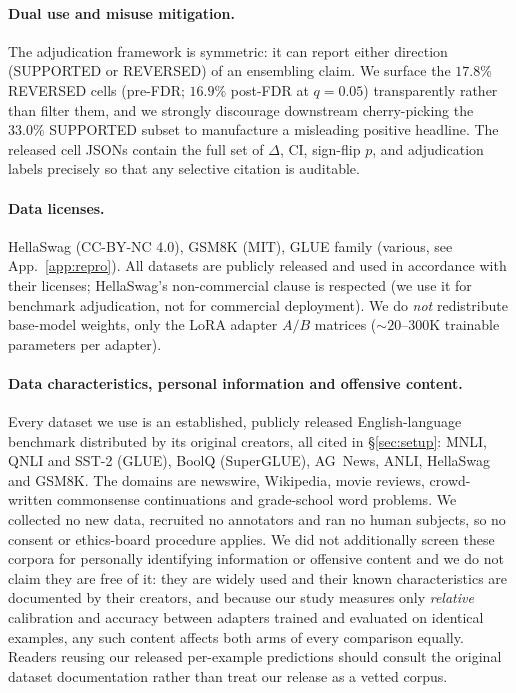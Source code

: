 \documentclass[11pt]{article}
\begin{document}
\paragraph{Dual use and misuse mitigation.} The adjudication framework is symmetric: it can report either direction (SUPPORTED or REVERSED) of an ensembling claim. We surface the $17.8\%$ REVERSED cells (pre-FDR; $16.9\%$ post-FDR at $q{=}0.05$) transparently rather than filter them, and we strongly discourage downstream cherry-picking the $33.0\%$ SUPPORTED subset to manufacture a misleading positive headline. The released cell JSONs contain the full set of $\Delta$, CI, sign-flip $p$, and adjudication labels precisely so that any selective citation is auditable.

\paragraph{Data licenses.} HellaSwag (CC-BY-NC 4.0), GSM8K (MIT), GLUE family (various, see App.~\ref{app:repro}). All datasets are publicly released and used in accordance with their licenses; HellaSwag's non-commercial clause is respected (we use it for benchmark adjudication, not for commercial deployment). We do \emph{not} redistribute base-model weights, only the LoRA adapter $A/B$ matrices ($\sim$$20$--$300$K trainable parameters per adapter).

\paragraph{Data characteristics, personal information and offensive content.} Every dataset we use is an established, publicly released English-language benchmark distributed by its original creators, all cited in \S\ref{sec:setup}: MNLI, QNLI and SST-2 (GLUE), BoolQ (SuperGLUE), AG~News, ANLI, HellaSwag and GSM8K. The domains are newswire, Wikipedia, movie reviews, crowd-written commonsense continuations and grade-school word problems. We collected no new data, recruited no annotators and ran no human subjects, so no consent or ethics-board procedure applies. We did not additionally screen these corpora for personally identifying information or offensive content and we do not claim they are free of it: they are widely used and their known characteristics are documented by their creators, and because our study measures only \emph{relative} calibration and accuracy between adapters trained and evaluated on identical examples, any such content affects both arms of every comparison equally. Readers reusing our released per-example predictions should consult the original dataset documentation rather than treat our release as a vetted corpus.
\end{document}
